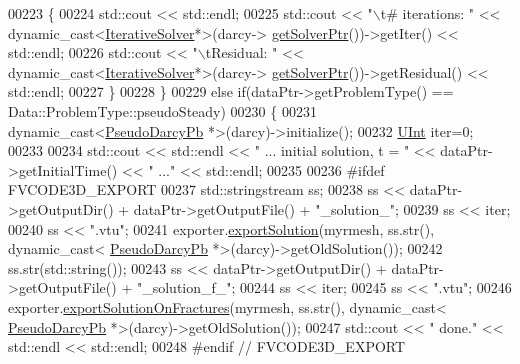 \begin{DoxyCode}
00223         \{
00224             std::cout << std::endl;
00225             std::cout << \textcolor{stringliteral}{"\(\backslash\)t# iterations: "} << \textcolor{keyword}{dynamic\_cast<}\hyperlink{classFVCode3D_1_1IterativeSolver}{IterativeSolver}*\textcolor{keyword}{>}(darcy->
      \hyperlink{classFVCode3D_1_1Problem_a24f0f7e726e4c68a0eac87a4a4054823}{getSolverPtr}())->getIter() << std::endl;
00226             std::cout << \textcolor{stringliteral}{"\(\backslash\)tResidual: "} << \textcolor{keyword}{dynamic\_cast<}\hyperlink{classFVCode3D_1_1IterativeSolver}{IterativeSolver}*\textcolor{keyword}{>}(darcy->
      \hyperlink{classFVCode3D_1_1Problem_a24f0f7e726e4c68a0eac87a4a4054823}{getSolverPtr}())->getResidual() << std::endl;
00227         \}
00228     \}
00229     \textcolor{keywordflow}{else} \textcolor{keywordflow}{if}(dataPtr->getProblemType() == Data::ProblemType::pseudoSteady)
00230     \{
00231         \textcolor{keyword}{dynamic\_cast<}\hyperlink{classFVCode3D_1_1DarcyPseudoSteady}{PseudoDarcyPb} *\textcolor{keyword}{>}(darcy)->initialize();
00232         \hyperlink{namespaceFVCode3D_a4bf7e328c75d0fd504050d040ebe9eda}{UInt} iter=0;
00233 
00234         std::cout << std::endl << \textcolor{stringliteral}{" ... initial solution, t = "} << dataPtr->getInitialTime() << \textcolor{stringliteral}{" ..."} << 
      std::endl;
00235 
00236 \textcolor{preprocessor}{#ifdef FVCODE3D\_EXPORT}
00237         std::stringstream ss;
00238         ss << dataPtr->getOutputDir() + dataPtr->getOutputFile() + \textcolor{stringliteral}{"\_solution\_"};
00239         ss << iter;
00240         ss << \textcolor{stringliteral}{".vtu"};
00241         exporter.\hyperlink{classFVCode3D_1_1ExporterVTU_a476a1dd02bcba8c31f0d99c7106d0c21}{exportSolution}(myrmesh, ss.str(), \textcolor{keyword}{dynamic\_cast<}
      \hyperlink{classFVCode3D_1_1DarcyPseudoSteady}{PseudoDarcyPb} *\textcolor{keyword}{>}(darcy)->getOldSolution());
00242         ss.str(std::string());
00243         ss << dataPtr->getOutputDir() + dataPtr->getOutputFile() + \textcolor{stringliteral}{"\_solution\_f\_"};
00244         ss << iter;
00245         ss << \textcolor{stringliteral}{".vtu"};
00246         exporter.\hyperlink{classFVCode3D_1_1ExporterVTU_abc88a5113c02b55942862ef39b30ec80}{exportSolutionOnFractures}(myrmesh, ss.str(), \textcolor{keyword}{dynamic\_cast<}
      \hyperlink{classFVCode3D_1_1DarcyPseudoSteady}{PseudoDarcyPb} *\textcolor{keyword}{>}(darcy)->getOldSolution());
00247         std::cout << \textcolor{stringliteral}{"  done."} << std::endl << std::endl;
00248 \textcolor{preprocessor}{#endif // FVCODE3D\_EXPORT}

\end{DoxyCode}
